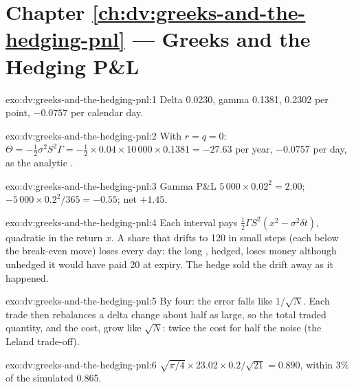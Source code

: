\section*{Chapter \ref{ch:dv:greeks-and-the-hedging-pnl} --- Greeks and the Hedging P\&L}

\begin{solution}{exo:dv:greeks-and-the-hedging-pnl:1}
Delta 0.0230, gamma 0.1381,  0.2302 per point,  $-0.0757$ per calendar day.
\end{solution}

\begin{solution}{exo:dv:greeks-and-the-hedging-pnl:2}
With $r=q=0$: $\Theta=-\tfrac12\sigma^2S^2\Gamma=-\tfrac12\times0.04\times10\,000\times0.1381
=-27.63$ per year, $-0.0757$ per day, as the analytic .
\end{solution}

\begin{solution}{exo:dv:greeks-and-the-hedging-pnl:3}
Gamma P\&L $5\,000\times0.02^2=2.00$;  $-5\,000\times0.2^2/365=-0.55$; net $+1.45$.
\end{solution}

\begin{solution}{exo:dv:greeks-and-the-hedging-pnl:4}
Each interval pays $\tfrac12\Gamma S^2(x^2-\sigma^2\delta t)$, quadratic in the return
$x$. A share that drifts to 120 in small steps (each below the break-even move) loses
 every day: the long , hedged, loses money although unhedged it would
have paid 20 at expiry. The hedge sold the drift away as it happened.
\end{solution}

\begin{solution}{exo:dv:greeks-and-the-hedging-pnl:5}
By four: the error falls like $1/\sqrt N$. Each trade then rebalances a delta change
about half as large, so the total traded quantity, and the cost, grow like $\sqrt N$:
twice the cost for half the noise (the Leland trade-off).
\end{solution}

\begin{solution}{exo:dv:greeks-and-the-hedging-pnl:6}
$\sqrt{\pi/4}\times23.02\times0.2/\sqrt{21}=0.890$, within 3\% of the simulated 0.865.
\end{solution}

